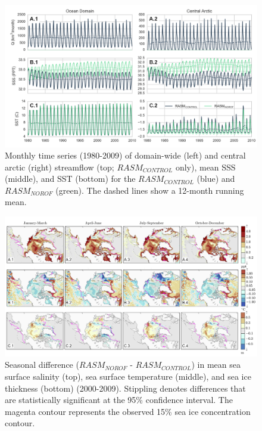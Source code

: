 \documentclass[jgrga, draft]{agutex}
\begin{document}
\clearpage
\begin{figure}
\noindent\includegraphics[width=40pc,natwidth=1]{ocean_combine_ts}
\caption{Monthly time series (1980-2009) of domain-wide (left) and central arctic (right) streamflow (top; $RASM_{CONTROL}$ only), mean SSS (middle), and SST (bottom) for the $RASM_{CONTROL}$ (blue) and $RASM_{NOROF}$ (green). The dashed lines show a 12-month running mean.
}
\label{fig:ocean_timeseries}
\end{figure}

\clearpage
\begin{figure}
\noindent\includegraphics[width=40pc,natwidth=1]{ocean_combine}
\caption{Seasonal difference ($RASM_{NOROF}$ - $RASM_{CONTROL}$) in mean sea surface salinity (top), sea surface temperature (middle), and sea ice thickness (bottom) (2000-2009). Stippling denotes differences that are statistically significant at the 95\%  confidence interval. The magenta contour represents the observed 15\% sea ice concentration contour. }
\label{fig:ocean_maps}
\end{figure}


\clearpage
\end{document}
